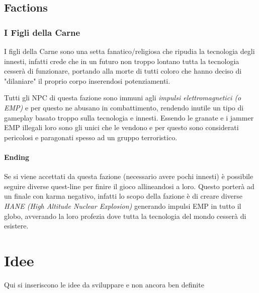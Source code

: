 \documentclass[a4paper]{report}
\begin{document}
\section{Factions}
\subsection{I Figli della Carne}
I figli della Carne sono una setta fanatico/religiosa che ripudia la tecnologia degli innesti, infatti crede che in un futuro non troppo lontano tutta la tecnologia cesserà di funzionare, portando alla morte di tutti coloro che hanno deciso di "dilaniare" il proprio corpo inserendosi potenziamenti.

Tutti gli NPC di questa fazione sono immuni agli \textit{impulsi elettromagnetici (o EMP)} e per questo ne abusano in combattimento, rendendo inutile un tipo di gameplay basato troppo sulla tecnologia e innesti.
Essendo le granate e i jammer EMP illegali loro sono gli unici che le vendono e per questo sono considerati pericolosi e paragonati spesso ad un gruppo terroristico.

\subsubsection{Ending}
Se si viene accettati da questa fazione (necessario avere pochi innesti) è possibile seguire diverse quest-line per finire il gioco allineandosi a loro. Questo porterà ad un finale con karma negativo, infatti lo scopo della fazione è di creare diverse \textit{HANE (High Altitude Nuclear Explosion)} generando impulsi EMP in tutto il globo, avverando la loro profezia dove tutta la tecnologia del mondo cesserà di esistere.

\chapter{Idee}
Qui si inseriscono le idee da sviluppare e non ancora ben definite
\end{document}
